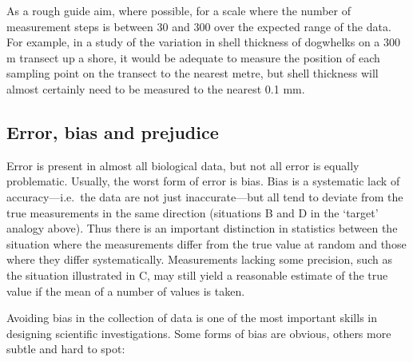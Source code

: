 \documentclass[
]{book}
\begin{document}
As a rough guide aim, where possible, for a scale where the number of measurement steps is between 30 and 300 over the expected range of the data. For example, in a study of the variation in shell thickness of dogwhelks on a 300 m transect up a shore, it would be adequate to measure the position of each sampling point on the transect to the nearest metre, but shell thickness will almost certainly need to be measured to the nearest 0.1 mm.

\hypertarget{error-bias-and-prejudice}{%
\subsection{Error, bias and prejudice}\label{error-bias-and-prejudice}}

Error is present in almost all biological data, but not all error is equally problematic. Usually, the worst form of error is bias. Bias is a systematic lack of accuracy---i.e.~the data are not just inaccurate---but all tend to deviate from the true measurements in the same direction (situations B and D in the `target' analogy above). Thus there is an important distinction in statistics between the situation where the measurements differ from the true value at random and those where they differ systematically. Measurements lacking some precision, such as the situation illustrated in C, may still yield a reasonable estimate of the true value if the mean of a number of values is taken.

Avoiding bias in the collection of data is one of the most important skills in designing scientific investigations. Some forms of bias are obvious, others more subtle and hard to spot:
\end{document}
